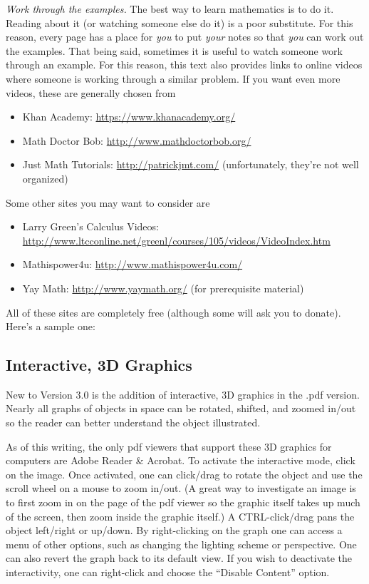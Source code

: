 \textit{Work through the examples.}  The best way to learn mathematics is to do it.  Reading about it (or watching someone else do it) is a poor substitute.  For this reason, every page has a place for \textit{you} to put \textit{your} notes so that \textit{you} can work out the examples.  That being said, sometimes it is useful to watch someone work through an example.  For this reason, this text also provides links to online videos where someone is working through a similar problem.  If you want even more videos, these are generally chosen from
\iflatexml\begin{itemize}\else\begin{itemize}[nosep]\fi
\item Khan Academy: \url{https://www.khanacademy.org/}
\item Math Doctor Bob: \url{http://www.mathdoctorbob.org/}
\item Just Math Tutorials: \url{http://patrickjmt.com/} (unfortunately, they're not well organized)
\end{itemize}
Some other sites you may want to consider are
\iflatexml\begin{itemize}\else\begin{itemize}[nosep]\fi
\item Larry Green's Calculus Videos: \url{http://www.ltcconline.net/greenl/courses/105/videos/VideoIndex.htm}
\item Mathispower4u: \url{http://www.mathispower4u.com/}
\item Yay Math: \url{http://www.yaymath.org/} (for prerequisite material)
\end{itemize}
All of these sites are completely free (although some will ask you to donate).  Here's a sample one:


\subsection{Interactive, 3D Graphics}

New to Version 3.0 is the addition of interactive, 3D graphics in the .pdf version. Nearly all graphs of objects in space can be rotated, shifted, and zoomed in/out so the reader can better understand the object illustrated. 

As of this writing, the only pdf viewers that support these 3D graphics for computers are Adobe Reader \& Acrobat. To activate the interactive mode, click on the image. Once activated, one can click/drag to rotate the object and use the scroll wheel on a mouse to zoom in/out. (A great way to investigate an image is to first zoom in on the page of the pdf viewer so the graphic itself takes up much of the screen, then zoom inside the graphic itself.) A CTRL-click/drag pans the object left/right or up/down. By right-clicking on the graph one can access a menu of other options, such as changing the lighting scheme or perspective. One can also revert the graph back to its default view. If you wish to deactivate the interactivity, one can right-click and choose the ``Disable Content'' option.


\end{itemize}
\end{itemize}
